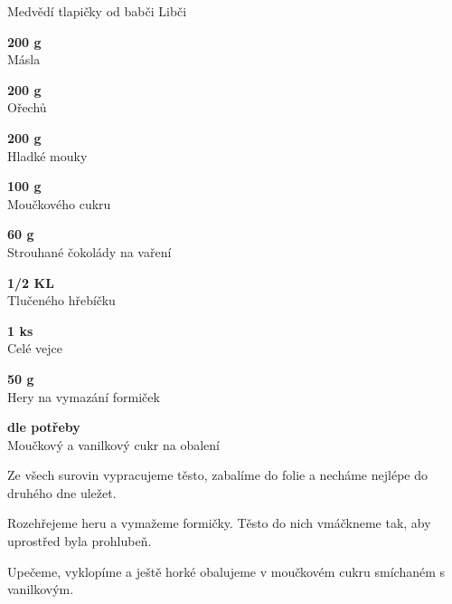 \documentclass[11pt,a4paper]{article}
\begin{document}
\begin{recipe}[SaddleBrown]{Medvědí tlapičky od babči Libči}
    \begin{ingredients}
        \item \parbox[t]{\linewidth}{\raggedright \weight \textbf{200 g}\\ Másla}
        \item \parbox[t]{\linewidth}{\raggedright \weight \textbf{200 g}\\ Ořechů}
        \item \parbox[t]{\linewidth}{\raggedright \weight \textbf{200 g}\\ Hladké mouky}
        \item \parbox[t]{\linewidth}{\raggedright \weight \textbf{100 g}\\ Moučkového cukru}
        \item \parbox[t]{\linewidth}{\raggedright \weight \textbf{60 g}\\ Strouhané čokolády na vaření}
        \item \parbox[t]{\linewidth}{\raggedright \weight \textbf{1/2 KL}\\ Tlučeného hřebíčku}
        \item \parbox[t]{\linewidth}{\raggedright \piece \textbf{1 ks}\\ Celé vejce}
        \item \parbox[t]{\linewidth}{\raggedright \weight \textbf{50 g}\\ Hery na vymazání formiček}
        \item \parbox[t]{\linewidth}{\raggedright \indefinite \textbf{dle potřeby}\\ Moučkový a vanilkový cukr na obalení}
    \end{ingredients}
    \begin{steps}
        \item Ze všech surovin vypracujeme těsto, zabalíme do folie a necháme nejlépe do druhého dne uležet.
        \item Rozehřejeme heru a vymažeme formičky. Těsto do nich vmáčkneme tak, aby uprostřed byla prohlubeň.
        \item Upečeme, vyklopíme a ještě horké obalujeme v moučkovém cukru smíchaném s vanilkovým.
    \end{steps}
\end{recipe}
\end{document}
